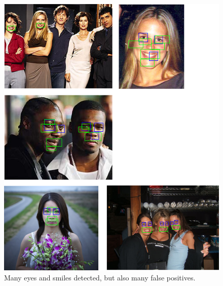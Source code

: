 \documentclass[11pt, a4paper, twocolumn]{article}
\begin{document}
\begin{figure}[h]
 \includegraphics[width=1.0\columnwidth]{images/02_manyFalsePositives_manyDetected.png}
 \centering
 \caption{Many eyes and smiles detected, but also many false positives.}
 \label{fig:01_manyFalsePositives}
\end{figure}
\end{document}
